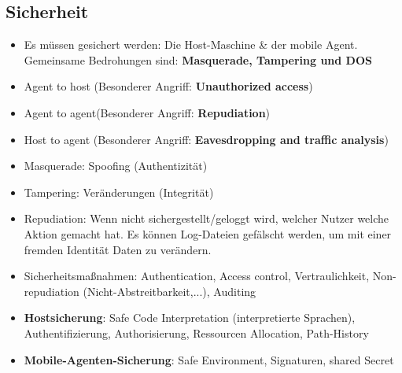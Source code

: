 \documentclass{article} %
\begin{document}
	\subsection{Sicherheit}
	\begin{itemize}		
		\item Es müssen gesichert werden: Die Host-Maschine \& der mobile Agent. Gemeinsame Bedrohungen sind: \textbf{Masquerade, Tampering und DOS}
		\item Agent to host (Besonderer Angriff: \textbf{Unauthorized access}) 
		\item Agent to agent(Besonderer Angriff: \textbf{Repudiation}) 
		\item Host to agent (Besonderer Angriff: \textbf{Eavesdropping and traffic analysis}) 
		\item Masquerade: Spoofing (Authentizität)
		\item Tampering: Veränderungen (Integrität)
		\item Repudiation: Wenn nicht sichergestellt/geloggt wird, welcher Nutzer welche Aktion gemacht hat. Es können Log-Dateien gefälscht werden, um mit einer fremden Identität Daten zu verändern.
		\item Sicherheitsmaßnahmen: Authentication, Access control, Vertraulichkeit, Non-repudiation (Nicht-Abstreitbarkeit,...), Auditing
		\item \textbf{Hostsicherung}: Safe Code Interpretation (interpretierte Sprachen), Authentifizierung, Authorisierung, Ressourcen Allocation, Path-History
		\item \textbf{Mobile-Agenten-Sicherung}: Safe Environment, Signaturen, shared Secret
	\end{itemize}
\end{document}
